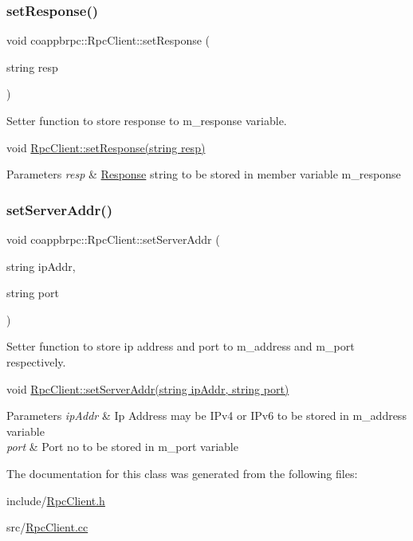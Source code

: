 \subsubsection{\texorpdfstring{set\+Response()}{setResponse()}}
{\footnotesize\ttfamily void coappbrpc\+::\+Rpc\+Client\+::set\+Response (\begin{DoxyParamCaption}\item[{string}]{resp }\end{DoxyParamCaption})}



Setter function to store response to m\+\_\+response variable. 

void \hyperlink{classcoappbrpc_1_1RpcClient_a0f08b63838a62377d4470eb2a0259178}{Rpc\+Client\+::set\+Response(string resp)} 
\begin{DoxyParams}{Parameters}
{\em resp} & \hyperlink{classcoappbrpc_1_1Response}{Response} string to be stored in member variable m\+\_\+response \\
\hline
\end{DoxyParams}
\mbox{\label{classcoappbrpc_1_1RpcClient_a69755d690a7f2d6373e191d359e48986}} 
\subsubsection{\texorpdfstring{set\+Server\+Addr()}{setServerAddr()}}
{\footnotesize\ttfamily void coappbrpc\+::\+Rpc\+Client\+::set\+Server\+Addr (\begin{DoxyParamCaption}\item[{string}]{ip\+Addr,  }\item[{string}]{port }\end{DoxyParamCaption})}



Setter function to store ip address and port to m\+\_\+address and m\+\_\+port respectively. 

void \hyperlink{classcoappbrpc_1_1RpcClient_a69755d690a7f2d6373e191d359e48986}{Rpc\+Client\+::set\+Server\+Addr(string ip\+Addr, string port)} 
\begin{DoxyParams}{Parameters}
{\em ip\+Addr} & Ip Address may be I\+Pv4 or I\+Pv6 to be stored in m\+\_\+address variable \\
\hline
{\em port} & Port no to be stored in m\+\_\+port variable \\
\hline
\end{DoxyParams}


The documentation for this class was generated from the following files\+:\begin{DoxyCompactItemize}
\item 
include/\hyperlink{RpcClient_8h}{Rpc\+Client.\+h}\item 
src/\hyperlink{RpcClient_8cc}{Rpc\+Client.\+cc}\end{DoxyCompactItemize}
